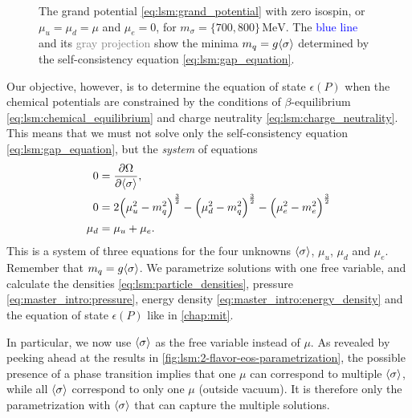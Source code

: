 \begin{figure}[t]
\caption{\label{fig:lsm:grand-potential-noisospin}%
	The grand potential \eqref{eq:lsm:grand_potential} with zero isospin, or $\mu_u = \mu_d = \mu$ and $\mu_e=0$, for $m_\sigma=\{700,800\} \, \si{\mega\electronvolt}$.
	The \textcolor{blue}{blue line} and its \textcolor{gray}{gray projection} show the minima $m_q = g \langle \sigma \rangle$ determined by the self-consistency equation \eqref{eq:lsm:gap_equation}.
}
\end{figure}

Our objective, however, is to determine the equation of state $\epsilon(P)$
when the chemical potentials are constrained by the conditions 
of $\beta$-equilibrium \eqref{eq:lsm:chemical_equilibrium}
and charge neutrality \eqref{eq:lsm:charge_neutrality}.
This means that we must not solve only the self-consistency equation \eqref{eq:lsm:gap_equation},
but the \emph{system} of equations
\begin{subequations}
\begin{align}
	0 &= \pdv{\Omega}{ \langle \sigma \rangle} , \label{eq:lsm:minsys_min} \\
	0 &= 2 \Big(\mu_u^2-m_q^2\Big)^\frac32 - \Big(\mu_d^2-m_q^2\Big)^\frac32 - \Big(\mu_e^2-m_e^2\Big)^\frac32 \label{eq:lsm:minsys_charge} \\
	\mu_d &= \mu_u + \mu_e .
\end{align}%
\label{eq:lsm:minsys}%
\end{subequations}%
This is a system of three equations for the four unknowns $\langle \sigma \rangle$, $\mu_u$, $\mu_d$ and $\mu_e$.
Remember that $m_q = g \langle \sigma \rangle$.
We parametrize solutions with one free variable, 
and calculate the densities \eqref{eq:lsm:particle_densities}, pressure \eqref{eq:master_intro:pressure}, energy density \eqref{eq:master_intro:energy_density}
and the equation of state $\epsilon(P)$ like in \cref{chap:mit}.

In particular, we now use $\langle \sigma \rangle$ as the free variable instead of $\mu$.
As revealed by peeking ahead at the results in \cref{fig:lsm:2-flavor-eos-parametrization},
the possible presence of a phase transition implies that
one $\mu$ can correspond to multiple $\langle \sigma \rangle$,
while all $\langle \sigma \rangle$ correspond to only one $\mu$ (outside vacuum).
It is therefore only the parametrization with $\langle \sigma \rangle$ that can capture the multiple solutions.

